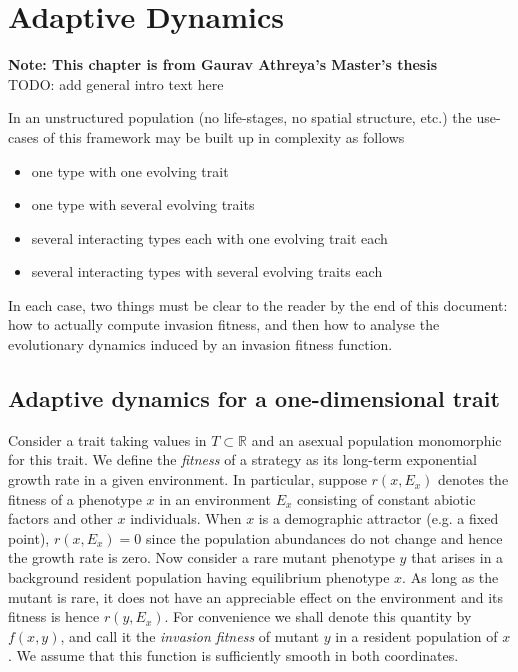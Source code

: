 

\chapter{Adaptive Dynamics}

\textbf{Note: This chapter is from Gaurav Athreya's Master's thesis~\citep{athreya_thesis_2023}}
\\

{\color{red}TODO: add general intro text here}

In an unstructured population (no life-stages, no spatial structure, etc.) the use-cases of this framework may be built up in complexity as follows
\begin{itemize} \itemsep -1mm
	\item one type with one evolving trait
	\item one type with several evolving traits
	\item several interacting types each with one evolving trait each
	\item several interacting types with several evolving traits each
\end{itemize}  

In each case, two things must be clear to the reader by the end of this document: how to actually compute invasion fitness, and then how to analyse the evolutionary dynamics induced by an invasion fitness function. 

\section{Adaptive dynamics for a one-dimensional trait}
\label{section:1-dim-AD}

Consider a trait taking values in $T \subset \mathbb{R}$ and an asexual population monomorphic for this trait. We define the \emph{fitness} of a strategy as its long-term exponential growth rate in a given environment. 
In particular, suppose $r(x, E_x)$ denotes the fitness of a phenotype $x$ in an environment $E_x$ consisting of constant abiotic factors and other $x$ individuals.
When $x$ is a demographic attractor (e.g. a fixed point), $r(x, E_x) = 0$ since the population abundances do not change and hence the growth rate is zero. 
Now consider a rare mutant phenotype $y$ that arises in a background resident population having equilibrium phenotype $x$.  
As long as the mutant is rare, it does not have an appreciable effect on the environment and its fitness is hence $r(y, E_x)$. 
For convenience we shall denote this quantity by $f(x,y)$, and call it the \textit{invasion fitness} of mutant $y$ in a resident population of $x$. 
We assume that this function is sufficiently smooth in both coordinates. 

